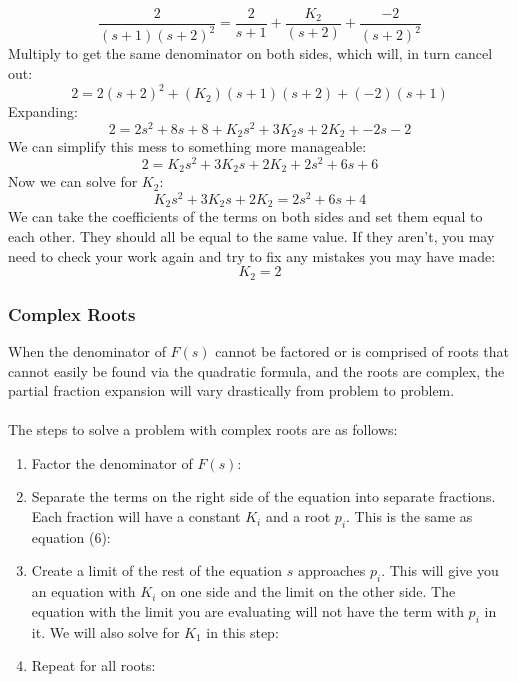 \documentclass{article}
\theoremstyle{mytheoremstyle}
\theoremstyle{mytheoremstyle}
\theoremstyle{myproblemstyle}
\theoremstyle{break}
\begin{document}
\begin{solution}[\textcolor{blue}{Repeated Real Roots}]
\begin{enumerate}
\begin{equation}
			      \frac{2}{(s+1)(s+2)^2} = \frac{2}{s+1} + \frac{K_2}{(s+2)} + \frac{-2}{(s+2)^2}
		      \end{equation}
		Multiply to get the same denominator on both sides, which will, in turn cancel out:
			\begin{equation}
				2 = 2(s+2)^2 + (K_2)(s+1)(s+2) + (-2)(s+1)
			\end{equation}
		Expanding:
		\begin{equation}
			2 = 2 s^{2} + 8 s + 8 + K_{2} s^{2} + 3 K_{2} s + 2 K_{2} + - 2 s - 2
		\end{equation}
		We can simplify this mess to something more manageable:
		\begin{equation}
			2 = K_{2} s^{2} + 3 K_{2} s + 2 K_{2} + 2 s^{2} + 6 s + 6
		\end{equation}
		Now we can solve for $K_2$:
		\begin{equation}
			K_{2} s^{2} + 3 K_{2} s + 2 K_{2} = 2 s^{2} + 6 s + 4
		\end{equation}
		We can take the coefficients of the terms on both sides and set them equal to each other. They should all be equal to the same value. If they aren't, you may need to check your work again and try to fix any mistakes you may have made:
		\begin{equation}
			K_{2} = 2
		\end{equation}
	\end{enumerate}
\end{solution}

\subsubsection{Complex Roots}

When the denominator of $F(s)$ cannot be factored or is comprised of roots that cannot easily be found via the quadratic formula, and the roots are complex, the partial fraction expansion will vary drastically from problem to problem.\\\\
The steps to solve a problem with complex roots are as follows:
\begin{enumerate}
	\item Factor the denominator of $F(s)$:	  
	\item Separate the terms on the right side of the equation into separate fractions. Each fraction will have a constant $K_i$ and a root $p_i$. This is the same as equation (6):
	\item Create a limit of the rest of the equation $s$ approaches $p_i$. This will give you an equation with $K_i$ on one side and the limit on the other side. The equation with the limit you are evaluating will not have the term with $p_i$ in it. We will also solve for $K_1$ in this step:
	\item Repeat for all roots:
\end{enumerate}
\end{document}
